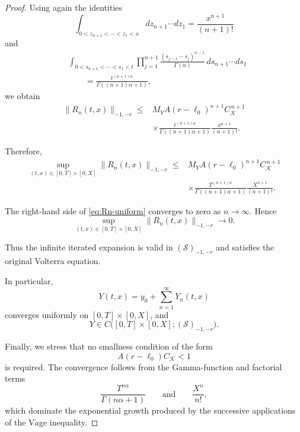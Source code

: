 \documentclass[10pt,a4paper]{amsart}
\begin{document}
\begin{proof}
Using again the identities
\begin{equation}
\int_{0<z_{n+1}<\cdots<z_1<x}
dz_{n+1}\cdots dz_1
=
\frac{x^{n+1}}{(n+1)!}
\end{equation}
and
\begin{equation}
\begin{aligned}
&
\int_{0<s_{n+1}<\cdots<s_1<t}
\prod_{j=1}^{n+1}
\frac{(s_{j-1}-s_j)^{\alpha-1}}
{\Gamma(\alpha)}
\,ds_{n+1}\cdots ds_1
\\
&\qquad=
\frac{t^{(n+1)\alpha}}
{\Gamma((n+1)\alpha+1)},
\end{aligned}
\end{equation}
we obtain
\begin{equation}
\boxed{
\begin{aligned}
\|R_n(t,x)\|_{-1,-r}
\leq{}&
M_Y
A(r-\ell_0)^{n+1}
C_{\mathcal K}^{\,n+1}
\\
&\times
\frac{t^{(n+1)\alpha}}
{\Gamma((n+1)\alpha+1)}
\frac{x^{n+1}}
{(n+1)!}.
\end{aligned}
}
\label{eq:Rn-final}
\end{equation}

Therefore,
\begin{equation}
\begin{aligned}
\sup_{(t,x)\in[0,T]\times[0,X]}
\|R_n(t,x)\|_{-1,-r}
\leq{}&
M_Y
A(r-\ell_0)^{n+1}
C_{\mathcal K}^{\,n+1}
\\
&\times
\frac{T^{(n+1)\alpha}}
{\Gamma((n+1)\alpha+1)}
\frac{X^{n+1}}
{(n+1)!}.
\end{aligned}
\label{eq:Rn-uniform}
\end{equation}

The right-hand side of \eqref{eq:Rn-uniform} converges to zero as
$n\to\infty$. Hence
\begin{equation}
\boxed{
\sup_{(t,x)\in[0,T]\times[0,X]}
\|R_n(t,x)\|_{-1,-r}
\longrightarrow0.
}
\label{eq:Rn-to-zero}
\end{equation}

Thus the infinite iterated expansion is valid in
$(\mathcal S)_{-1,-r}$ and satisfies the original Volterra equation.

In particular,
\[
Y(t,x)
=
y_0+\sum_{n=1}^{\infty}Y_n(t,x)
\]
converges uniformly on $[0,T]\times[0,X]$, and
\[
Y\in
C\big([0,T]\times[0,X];(\mathcal S)_{-1,-r}\big).
\]

Finally, we stress that no smallness condition of the form
\[
A(r-\ell_0)C_{\mathcal K}<1
\]
is required. The convergence follows from the Gamma-function and
factorial terms
\[
\frac{T^{n\alpha}}{\Gamma(n\alpha+1)}
\qquad\text{and}\qquad
\frac{X^n}{n!},
\]
which dominate the exponential growth produced by the successive
applications of the V$\mathring{a}$ge inequality.
\end{proof}
\end{document}
